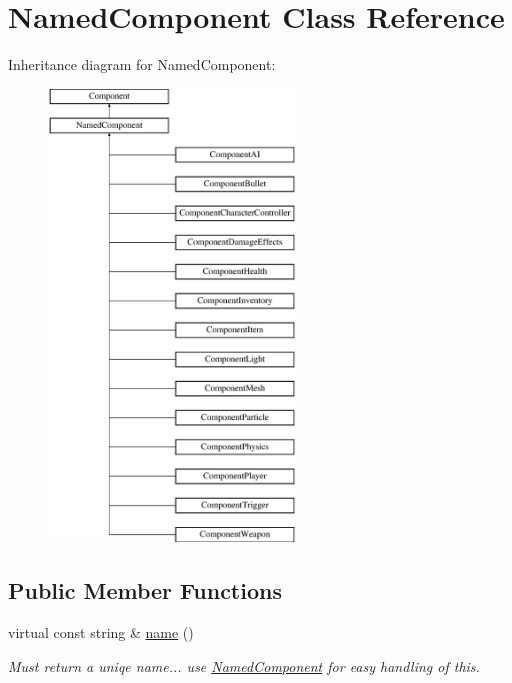 \hypertarget{classNamedComponent}{
\section{\-Named\-Component \-Class \-Reference}
\label{df/d5f/classNamedComponent}
}
\-Inheritance diagram for \-Named\-Component\-:\begin{figure}[H]
\begin{center}
\leavevmode
\includegraphics[height=12.000000cm]{df/d5f/classNamedComponent}
\end{center}
\end{figure}
\subsection*{\-Public \-Member \-Functions}
\begin{DoxyCompactItemize}
\item 
\hypertarget{classNamedComponent_a06cd94e97a0c9fa157f27de10cc548a4}{
virtual const string \& \hyperlink{classNamedComponent_a06cd94e97a0c9fa157f27de10cc548a4}{name} ()}
\label{df/d5f/classNamedComponent_a06cd94e97a0c9fa157f27de10cc548a4}

\begin{DoxyCompactList}\small\item\em \-Must return a uniqe name... use \hyperlink{classNamedComponent}{\-Named\-Component} for easy handling of this. \end{DoxyCompactList}\end{DoxyCompactItemize}
